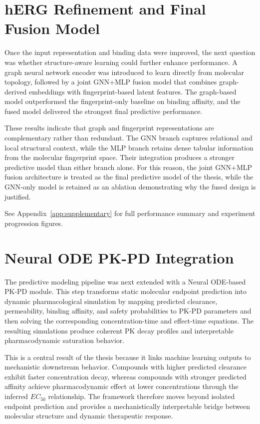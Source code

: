 \documentclass[a4paper,11pt,twoside]{report}
\begin{document}
\section{hERG Refinement and Final Fusion Model}

Once the input representation and binding data were improved, the next question was whether structure-aware learning could further enhance performance. A graph neural network encoder was introduced to learn directly from molecular topology, followed by a joint GNN+MLP fusion model that combines graph-derived embeddings with fingerprint-based latent features. The graph-based model outperformed the fingerprint-only baseline on binding affinity, and the fused model delivered the strongest final predictive performance.

These results indicate that graph and fingerprint representations are complementary rather than redundant. The GNN branch captures relational and local structural context, while the MLP branch retains dense tabular information from the molecular fingerprint space. Their integration produces a stronger predictive model than either branch alone. For this reason, the joint GNN+MLP fusion architecture is treated as the final predictive model of the thesis, while the GNN-only model is retained as an ablation demonstrating why the fused design is justified.


See Appendix~\ref{app:supplementary} for full performance summary and experiment progression figures.

\section{Neural ODE PK-PD Integration}

The predictive modeling pipeline was next extended with a Neural ODE-based PK-PD module. This step transforms static molecular endpoint prediction into dynamic pharmacological simulation by mapping predicted clearance, permeability, binding affinity, and safety probabilities to PK-PD parameters and then solving the corresponding concentration-time and effect-time equations. The resulting simulations produce coherent PK decay profiles and interpretable pharmacodynamic saturation behavior.

This is a central result of the thesis because it links machine learning outputs to mechanistic downstream behavior. Compounds with higher predicted clearance exhibit faster concentration decay, whereas compounds with stronger predicted affinity achieve pharmacodynamic effect at lower concentrations through the inferred $EC_{50}$ relationship. The framework therefore moves beyond isolated endpoint prediction and provides a mechanistically interpretable bridge between molecular structure and dynamic therapeutic response.
\end{document}
